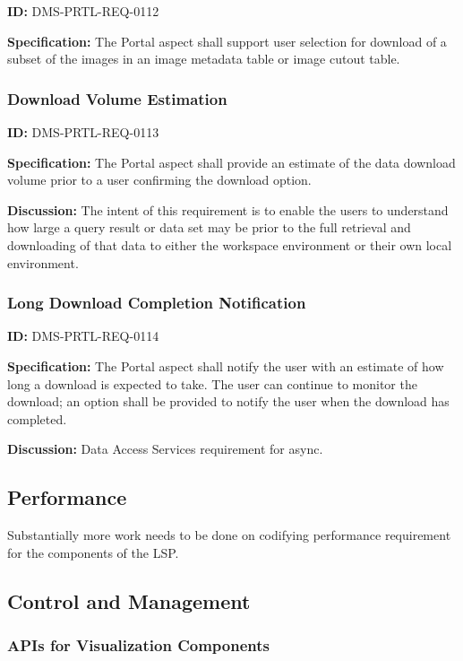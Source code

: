 \documentclass[SE,toc,lsstdraft]{lsstdoc}
\begin{document}
\label{DMS-PRTL-REQ-0112}
\textbf{ID:} DMS-PRTL-REQ-0112

\textbf{Specification:}
The Portal aspect shall support user selection for download of a subset of the images in an image metadata table or image cutout table.

\subsubsection{Download Volume Estimation}

\label{DMS-PRTL-REQ-0113}
\textbf{ID:} DMS-PRTL-REQ-0113

\textbf{Specification:}
The Portal aspect shall provide an estimate of the data download volume prior to a user confirming the download option.

\textbf{Discussion:}
The intent of this requirement is to enable the users to understand how large a query result or data set may be prior to the full retrieval and downloading of that data to either the workspace environment or their own local environment.

\subsubsection{Long Download Completion Notification}

\label{DMS-PRTL-REQ-0114}
\textbf{ID:} DMS-PRTL-REQ-0114

\textbf{Specification:}
The Portal aspect shall notify the user with an estimate of how long a download is expected to take. The user can continue to monitor the download; an option shall be provided to notify the user when the download has completed.

\textbf{Discussion:}
Data Access Services requirement for async.

\subsection{Performance}

Substantially more work needs to be done on codifying performance requirement for the components of the LSP.

\subsection{Control and Management}

\subsubsection{APIs for Visualization Components}
\end{document}
